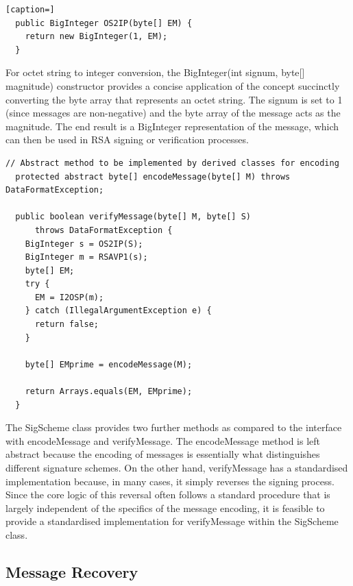 \documentclass[]{final_report}
\theoremstyle{definition}
\begin{document}
\begin{lstlisting}[caption=]
  public BigInteger OS2IP(byte[] EM) {
    return new BigInteger(1, EM);
  }
 \end{lstlisting}
For octet string to integer conversion, the BigInteger(int signum, byte[] magnitude) constructor provides a concise application of the concept succinctly converting the byte array that represents an octet string. The signum is set to 1 (since messages are non-negative) and the byte array of the message acts as the magnitude. The end result is a BigInteger representation of the message, which can then be used in RSA signing or verification processes.

 

\begin{lstlisting}[caption=Signature Scheme specialisation methods]
  // Abstract method to be implemented by derived classes for encoding
  protected abstract byte[] encodeMessage(byte[] M) throws DataFormatException;

  public boolean verifyMessage(byte[] M, byte[] S)
      throws DataFormatException {
    BigInteger s = OS2IP(S);
    BigInteger m = RSAVP1(s);
    byte[] EM;
    try {
      EM = I2OSP(m);
    } catch (IllegalArgumentException e) {
      return false;
    }

    byte[] EMprime = encodeMessage(M);

    return Arrays.equals(EM, EMprime);
  }
 \end{lstlisting}
 
The SigScheme class provides two further methods as compared to the interface with encodeMessage and verifyMessage. The encodeMessage method is left abstract because the encoding of messages is essentially what distinguishes different signature schemes. On the other hand, verifyMessage has a standardised implementation because, in many cases, it simply reverses the signing process. Since the core logic of this reversal often follows a standard procedure that is largely independent of the specifics of the message encoding, it is feasible to provide a standardised implementation for verifyMessage within the SigScheme class.

\subsection*{Message Recovery}
\end{document}
